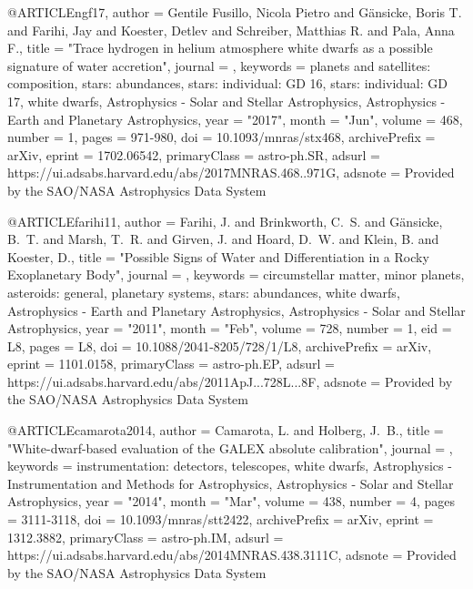 \documentclass[a4paper,fleqn,usenatbib]{mnras}
\begin{document}
{{{{{{{{{{{@ARTICLE{ngf17,
       author = {{Gentile Fusillo}, Nicola Pietro and {G{\"a}nsicke}, Boris T. and
         {Farihi}, Jay and {Koester}, Detlev and {Schreiber}, Matthias R. and
         {Pala}, Anna F.},
        title = "{Trace hydrogen in helium atmosphere white dwarfs as a possible signature of water accretion}",
      journal = {\mnras},
     keywords = {planets and satellites: composition, stars: abundances, stars: individual: GD 16, stars: individual: GD 17, white dwarfs, Astrophysics - Solar and Stellar Astrophysics, Astrophysics - Earth and Planetary Astrophysics},
         year = "2017",
        month = "Jun",
       volume = {468},
       number = {1},
        pages = {971-980},
          doi = {10.1093/mnras/stx468},
archivePrefix = {arXiv},
       eprint = {1702.06542},
 primaryClass = {astro-ph.SR},
       adsurl = {https://ui.adsabs.harvard.edu/abs/2017MNRAS.468..971G},
      adsnote = {Provided by the SAO/NASA Astrophysics Data System}
}

@ARTICLE{farihi11,
       author = {{Farihi}, J. and {Brinkworth}, C.~S. and {G{\"a}nsicke}, B.~T. and
         {Marsh}, T.~R. and {Girven}, J. and {Hoard}, D.~W. and {Klein}, B. and
         {Koester}, D.},
        title = "{Possible Signs of Water and Differentiation in a Rocky Exoplanetary Body}",
      journal = {\apjl},
     keywords = {circumstellar matter, minor planets, asteroids: general, planetary systems, stars: abundances, white dwarfs, Astrophysics - Earth and Planetary Astrophysics, Astrophysics - Solar and Stellar Astrophysics},
         year = "2011",
        month = "Feb",
       volume = {728},
       number = {1},
          eid = {L8},
        pages = {L8},
          doi = {10.1088/2041-8205/728/1/L8},
archivePrefix = {arXiv},
       eprint = {1101.0158},
 primaryClass = {astro-ph.EP},
       adsurl = {https://ui.adsabs.harvard.edu/abs/2011ApJ...728L...8F},
      adsnote = {Provided by the SAO/NASA Astrophysics Data System}
}

@ARTICLE{camarota2014,
       author = {{Camarota}, L. and {Holberg}, J.~B.},
        title = "{White-dwarf-based evaluation of the GALEX absolute calibration}",
      journal = {\mnras},
     keywords = {instrumentation: detectors, telescopes, white dwarfs, Astrophysics - Instrumentation and Methods for Astrophysics, Astrophysics - Solar and Stellar Astrophysics},
         year = "2014",
        month = "Mar",
       volume = {438},
       number = {4},
        pages = {3111-3118},
          doi = {10.1093/mnras/stt2422},
archivePrefix = {arXiv},
       eprint = {1312.3882},
 primaryClass = {astro-ph.IM},
       adsurl = {https://ui.adsabs.harvard.edu/abs/2014MNRAS.438.3111C},
      adsnote = {Provided by the SAO/NASA Astrophysics Data System}
}

}}}}}}}}}}}
\end{document}
